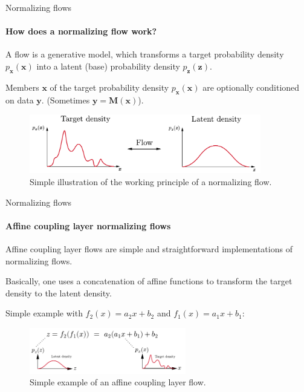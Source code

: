 \documentclass{beamer}
\newcommand\vect[1]{\ensuremath{\bm{#1}}}
\begin{document}
\begin{frame}[allowframebreaks]{Normalizing flows}
\framesubtitle{How does a normalizing flow work?}
A flow is a generative model, which transforms a target probability density $p_{\vect{x}}(\vect{x})$ into a latent (base) probability density $p_{\vect{z}}(\vect{z})$.

Members $\vect{x}$ of the target probability density $p_{\vect{x}}(\vect{x})$ are optionally conditioned on data $\vect{y}$. (Sometimes $\vect{y} = \vect{M}(\vect{x})$).

\begin{figure}[h!]
	\centering
	\includegraphics[width=0.9\textwidth]{figures/presentation/flowsimple.pdf}
	\caption{Simple illustration of the working principle of a normalizing flow.}
	\label{fig:flowsimple}
\end{figure}
\end{frame}

\begin{frame}[allowframebreaks]{Normalizing flows}
	\vspace{-0.5cm}
	\framesubtitle{Affine coupling layer normalizing flows}
Affine coupling layer flows are simple and straightforward implementations of normalizing flows.

Basically, one uses a concatenation of affine functions to transform the target density to the latent density.

Simple example with $f_2(x) = a_2x + b_2$ and $f_1(x) = a_1x + b_1$:
\begin{figure}
    \centering
    \includegraphics[height=2cm]{figures/presentation/acl_flows.pdf}
    \caption{Simple example of an affine coupling layer flow.}
    \label{fig:acl_flows}
\end{figure}
\end{frame}
\end{document}
